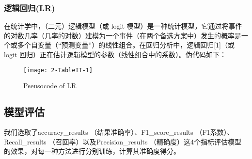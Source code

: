 \documentclass[a4paper,12pt]{article}
\begin{document}
\subsubsection{逻辑回归(LR)}

在统计学中，（二元）逻辑模型（或 logit 模型）是一种统计模型，它通过将事件的对数几率（几率的对数）建模为一个事件（在两个备选方案中）发生的概率是一个或多个自变量（“预测变量”）的线性组合。在回归分析中，逻辑回归[1]（或 logit 回归）正在估计逻辑模型的参数（线性组合中的系数）。伪代码如下：

\begin{figure}[htbp]
	\centering
	\texttt{[image: 2-TableII-1]}
	\caption{Pseusocode of LR}
\end{figure}
\subsection{模型评估}

%

我们选取了accuracy\_results （结果准确率）、F1\_score\_results （F1系数）、Recall\_results （召回率）以及Precision\_results （精确度）这4个指标评估模型的效果，对每一种方法进行分别训练，计算其准确度得分。
\end{document}

